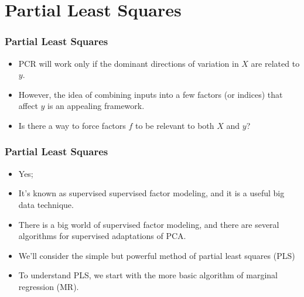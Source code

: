 \documentclass[
  shownotes,
  xcolor={svgnames},
  hyperref={colorlinks,citecolor=DarkBlue,linkcolor=DarkRed,urlcolor=DarkBlue}
  , aspectratio=169]{beamer}
\begin{document}
\section{Partial Least Squares }
\begin{frame}[fragile]
\frametitle{Partial Least Squares }

\begin{itemize}

\item  PCR will work only if the dominant directions of variation in $X$ are related to $y$.
\medskip
\item  However, the idea of combining inputs into a few factors (or indices) that affect $y$ is an appealing framework. 
\medskip
\item Is there a way to force factors $f$ to be relevant to both $X$ and $y$? 
\end{itemize}

\end{frame}
\begin{frame}[fragile]
\frametitle{Partial Least Squares }

\begin{itemize}
\item Yes; 
\medskip
\pause
\item It's known as supervised supervised factor modeling, and it is a useful big data technique. 
\medskip
\item There is a big world of supervised factor modeling, and there are several algorithms for supervised adaptations of PCA.
\medskip
\item  We’ll consider the simple but powerful method of partial least squares (PLS)

\medskip
\item  To understand PLS, we start with the more basic algorithm of marginal regression (MR).
\end{itemize}

\end{frame}
\end{document}
